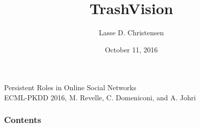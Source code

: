 \documentclass[10pt, hyperref={bookmarks=false}, show notes]{beamer}
\date{October 11, 2016}
\begin{document}

\title[Persistent Roles in
Online Social Networks]{TrashVision}
\author[\insertframenumber /\inserttotalframenumber]{Lasse D. Christensen}

\begin{frame}
\Large Persistent Roles in
Online Social Networks\\
\small ECML-PKDD 2016, M. Revelle, C. Domeniconi, and A. Johri\\
\end{frame}


\begin{frame}
  \frametitle{Contents}
  \tableofcontents
\end{frame}


%

%



\section*{}
\end{document}
